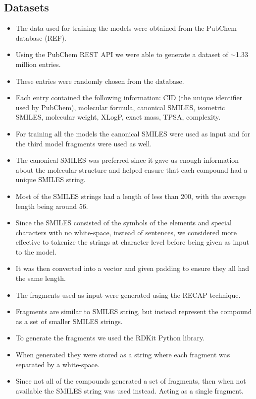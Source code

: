     \subsection{Datasets}
        \begin{itemize}
            \item The data used for training the models were obtained from the PubChem database (REF).
            \item Using the PubChem REST API we were able to generate a dataset of $\sim$1.33 million entries.
            \item These entries were randomly chosen from the database.
            \item Each entry contained the following information: CID (the unique identifier used by PubChem), molecular formula, canonical SMILES, isometric SMILES, molecular weight, XLogP, exact mass, TPSA, complexity.
            \item For training all the models the canonical SMILES were used as input and for the third model fragments were used as well.
            \item The canonical SMILES was preferred since it gave us enough information about the molecular structure and helped ensure that each compound had a unique SMILES string.
            \item Most of the SMILES strings had a length of less than 200, with the average length being around 56.
            \item Since the SMILES consisted of the symbols of the elements and special characters with no white-space, instead of sentences, we considered more effective to tokenize the strings at character level before being given as input to the model. 
            \item It was then converted into a vector and given padding to ensure they all had the same length.
            \item The fragments used as input were generated using the RECAP technique.
            \item Fragments are similar to SMILES string, but instead represent the compound as a set of smaller SMILES strings.
            \item To generate the fragments we used the RDKit \cite{rdkit} Python library.
            \item When generated they were stored as a string where each fragment was separated by a white-space.
            \item Since not all of the compounds generated a set of fragments, then when not available the SMILES string was used instead. Acting as a single fragment.

\end{itemize}
